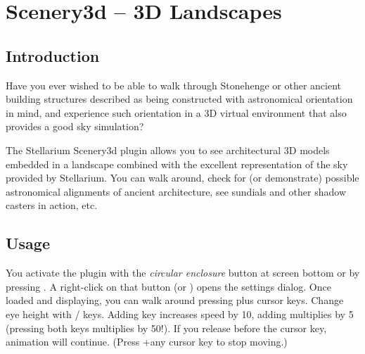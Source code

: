 
\chapter{Scenery3d -- 3D Landscapes}
\label{ch:scenery3d}


\section{Introduction}
\label{sec:scenery3d:Introduction}


Have you ever wished to be able to walk through Stonehenge or other
ancient building structures described as being constructed with
astronomical orientation in mind, and experience such orientation in a
3D virtual environment that also provides a good sky simulation?

The Stellarium Scenery3d plugin allows you to see architectural 3D models
embedded in a landscape combined with the excellent representation of the sky
provided by Stellarium. You can walk around, check for (or
demonstrate) possible astronomical alignments of ancient architecture, see
sundials and other shadow casters in action, etc.

\section{Usage}
\label{sec:scenery3d:Usage}


You activate the plugin with the \emph{circular enclosure} button  at screen
bottom or by pressing . A right-click on that button  (or )
opens the settings dialog. Once loaded and
displaying, you can walk around pressing \key{\ctrl} plus cursor keys. Change eye
height with / keys. Adding \key{\shift} key increases speed by 10,
adding \key{\Alt} multiplies by 5 (pressing both keys multiplies by 50!). If you release \key{\ctrl} before
the cursor key, animation will continue. (Press \key{\ctrl}+any cursor key to stop
moving.)

